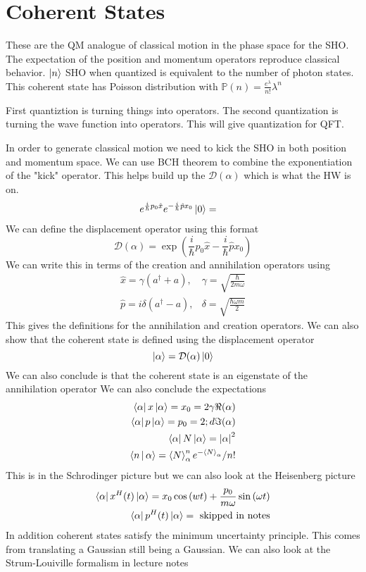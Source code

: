 \section{Coherent States}
These are the QM analogue of classical motion in the phase space for the SHO.
The expectation of the position and momentum operators reproduce classical
behavior. $\Ket{n}$ SHO when quantized is equivalent to the number of photon states.
This coherent state has Poisson distribution with 
$\mathbb{P}(n) = \frac{e^{\lambda}}{n!} \lambda^n$

First quantiztion is turning things into operators. The second quantization is turning
the wave function into operators. This will give quantization for QFT.

In order to generate classical motion we need to kick the SHO in both
position and momentum space. We can use BCH theorem to combine the exponentiation
of the "kick" operator. This helps build up the $\mathcal{D}(\alpha)$ which is what the
HW is on.
\begin{align*}
    e^{\frac{i}{\hbar} p_0 \hat{x}} e^{-\frac{i}{\hbar} \hat{p}x_0}
    \Ket{0}
    &=
\end{align*}
We can define the displacement operator using this format
$$
    \mathcal{D}(\alpha) = \exp \left(
        \frac{i}{\hbar} p_0 \hat{x} - \frac{i}{\hbar} \hat{p} x_0
    \right)
$$
We can write this in terms of the creation and annihilation operators using
\begin{align*}
    \hat{x} = \gamma \left(a^\dagger + a\right), & \gamma = \sqrt{\frac{\hbar}{2m \omega}} \\
    \hat{p} = i \delta (a^\dagger - a), & \delta = \sqrt{\frac{\hbar \omega m}{2}}
\end{align*}
This gives the definitions for the annihilation and creation operators.
We can also show that the coherent state is defined using the displacement operator
$$
    \Ket{\alpha} = \mathcal{D}(\alpha) \Ket{0}
$$
We can also conclude is that the coherent state is an eigenstate of the annihilation operator
We can also conclude the expectations
\begin{align}
    \Bra{\alpha}x\Ket{\alpha} = x_0 = 2 \gamma \Re(\alpha) \\
    \Bra{\alpha}p\Ket{\alpha} = p_0 = 2;d \Im(\alpha) \\
    \Bra{\alpha}N\Ket{\alpha} = \abs*{\alpha}^2 \\
    \Braket{n | \alpha} = \left<N\right>_{\alpha}^n e^{-\left<N\right>_{\alpha}} / n! \\
\end{align}
This is in the Schrodinger picture but we can also look at the Heisenberg picture
\begin{align}
    \Bra{\alpha}x^H(t)\Ket{\alpha} = x_0 \cos \left(wt\right) + 
        \frac{p_0}{m \omega} \sin \left(\omega t\right) \\
    \Bra{\alpha} p^H(t) \Ket{\alpha} = \text{ skipped in notes}
\end{align}
In addition coherent states satisfy the minimum uncertainty principle. This comes from
translating a Gaussian still being a Gaussian.
{\color{green} We can also look at the Strum-Louiville formalism in lecture notes}

